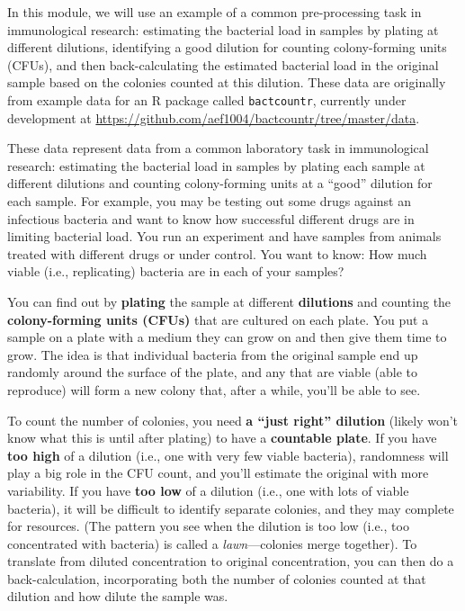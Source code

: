 \documentclass[]{tufte-book}
\begin{document}
In this module, we will use an example of a common pre-processing task in
immunological research: estimating the bacterial load in samples by plating
at different dilutions, identifying a good dilution for counting colony-forming
units (CFUs), and then back-calculating the estimated bacterial load in the
original sample based on the colonies counted at this dilution. These data
are originally from example data for an R package called \texttt{bactcountr},
currently under development at \url{https://github.com/aef1004/bactcountr/tree/master/data}.

These data represent data from a common laboratory task in immunological
research: estimating the bacterial load in samples by plating each sample at
different dilutions and counting colony-forming units at a ``good'' dilution for
each sample. For example, you may be testing out some drugs against an
infectious bacteria and want to know how successful different drugs are in
limiting bacterial load. You run an experiment and have samples from animals
treated with different drugs or under control. You want to know: How much viable
(i.e., replicating) bacteria are in each of your samples?

You can find out by \textbf{plating} the sample at different \textbf{dilutions} and
counting the \textbf{colony-forming units (CFUs)} that are cultured on each plate.
You put a sample on a plate with a medium they can grow on and then give them
time to grow. The idea is that individual bacteria from the original sample end
up randomly around the surface of the plate, and any that are viable (able to
reproduce) will form a new colony that, after a while, you'll be able to see.

To count the number of colonies, you need \textbf{a ``just right'' dilution} (likely
won't know what this is until after plating) to have a \textbf{countable plate}. If
you have \textbf{too high} of a dilution (i.e., one with very few viable bacteria),
randomness will play a big role in the CFU count, and you'll estimate the
original with more variability. If you have \textbf{too low} of a dilution (i.e., one
with lots of viable bacteria), it will be difficult to identify separate
colonies, and they may complete for resources. (The pattern you see when the
dilution is too low (i.e., too concentrated with bacteria) is called a
\emph{lawn}---colonies merge together). To translate from diluted concentration to
original concentration, you can then do a back-calculation, incorporating both
the number of colonies counted at that dilution and how dilute the sample was.
\end{document}
